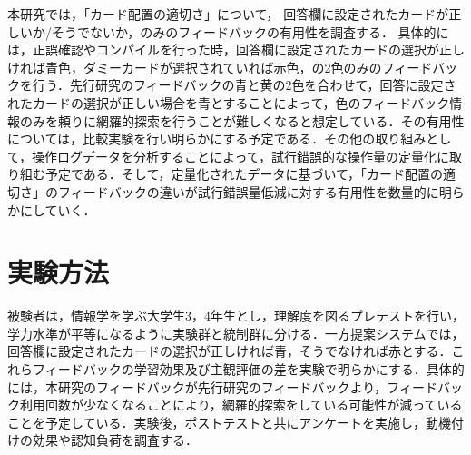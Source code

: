 \fi

本研究では，「カード配置の適切さ」について，%
回答欄に設定されたカードが正しいか/そうでないか，のみのフィードバックの有用性を調査する．
具体的には，正誤確認やコンパイルを行った時，回答欄に設定されたカードの選択が正しければ青色，ダミーカードが選択されていれば赤色，の2色のみのフィードバックを行う．先行研究のフィードバックの青と黄の2色を合わせて，回答に設定されたカードの選択が正しい場合を青とすることによって，色のフィードバック情報のみを頼りに網羅的探索を行うことが難しくなると想定している．その有用性については，比較実験を行い明らかにする予定である．その他の取り組みとして，操作ログデータを分析することによって，試行錯誤的な操作量の定量化に取り組む予定である．そして，定量化されたデータに基づいて，「カード配置の適切さ」のフィードバックの違いが試行錯誤量低減に対する有用性を数量的に明らかにしていく．


\section{実験方法}

被験者は，情報学を学ぶ大学生3，4年生とし，理解度を図るプレテストを行い，学力水準が平等になるように実験群と統制群に分ける．一方提案システムでは，回答欄に設定されたカードの選択が正しければ青，そうでなければ赤とする．これらフィードバックの学習効果及び主観評価の差を実験で明らかにする．具体的には，本研究のフィードバックが先行研究のフィードバックより，フィードバック利用回数が少なくなることにより，網羅的探索をしている可能性が減っていることを予定している．実験後，ポストテストと共にアンケートを実施し，動機付けの効果や認知負荷を調査する．